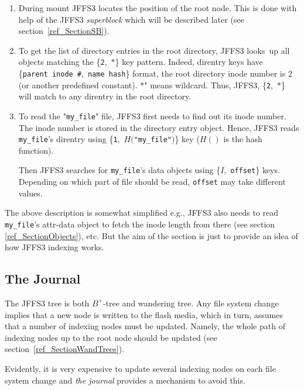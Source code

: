 \begin{enumerate}

\item During mount JFFS3 locates the position of the root node. This is done
with help of the JFFS3 \emph{superblock} which will be described later
(see section~\ref{ref_SectionSB}).

\item To get the list of directory entries in the root directory, JFFS3
looks~up all objects matching the \{\texttt{2},~$*$\} key pattern. Indeed,
direntry keys have \{\texttt{parent~inode~\#},~\texttt{name~hash}\} format, the
root directory inode number is 2 (or another predefined constant).  $*$" means
wildcard. Thus, JFFS3, \{\texttt{2},~$*$\} will match to any direntry in the
root directory.

\item To read the "\texttt{my\_file}" file, JFFS3 first needs to find out its
inode number. The inode number is stored in the directory entry object. Hence,
JFFS3 reads \texttt{my\_file}'s direntry using
\{\texttt{1},~$H($\texttt{"my\_file"$)$}\} key ($H()$ is the hash function).

Then JFFS3 searches for \texttt{my\_file}'s data objects using
\{$I$,~\texttt{offset}\} keys. Depending on which part of file should be read,
\texttt{offset} may take different values.

\end{enumerate}

The above description is somewhat simplified e.g., JFFS3 also needs to read
\texttt{my\_file}'s attr-data object to fetch the inode length from there (see
section \ref{ref_SectionObjects}), etc. But the aim of the section is just to
provide an idea of how JFFS3 indexing works.

%
%
\subsection{The Journal} \label{ref_SectionJournalIntro}

The JFFS3 tree is both \mbox{$B^+$-tree} and wandering tree. Any file system
change implies that a new node is written to the flash media, which in turn,
assumes that a number of indexing nodes must be updated. Namely, the whole path
of indexing nodes up to the root node should be updated (see
section~\ref{ref_SectionWandTrees}).

Evidently, it is very expensive to update several indexing nodes on each file
system change and \emph{the journal} provides a mechanism to avoid this.


